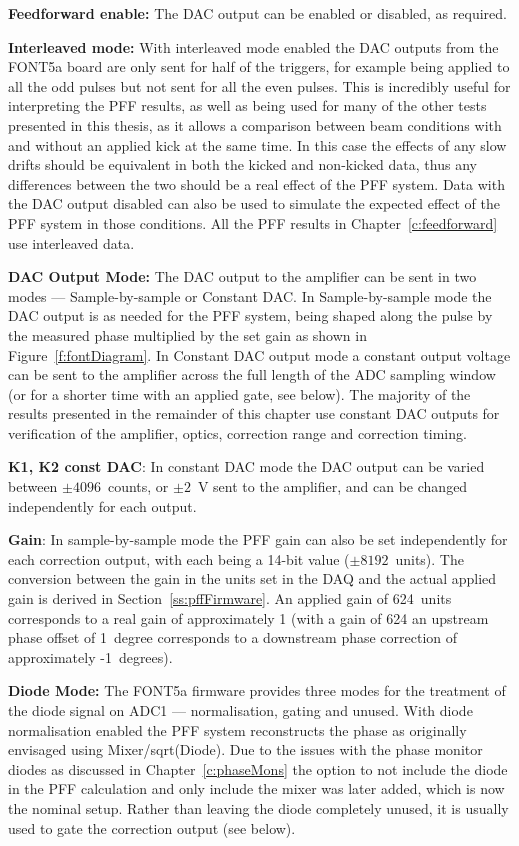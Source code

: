 \textbf{Feedforward enable:} The DAC output can be enabled or disabled, as required.

\textbf{Interleaved mode:} With interleaved mode enabled the DAC outputs from the FONT5a board are only sent for half of the triggers, for example being applied to all the odd pulses but not sent for all the even pulses. This is incredibly useful for interpreting the PFF results, as well as being used for many of the other tests presented in this thesis, as it allows a comparison between beam conditions with and without an applied kick at the same time. In this case the effects of any slow drifts should be equivalent in both the kicked and non-kicked data, thus any differences between the two should be a real effect of the PFF system. Data with the DAC output disabled can also be used to simulate the expected effect of the PFF system in those conditions. All the PFF results in Chapter~\ref{c:feedforward} use interleaved data.

\textbf{DAC Output Mode:} The DAC output to the amplifier can be sent in two modes --- Sample-by-sample or Constant DAC. In Sample-by-sample mode the DAC output is as needed for the PFF system, being shaped along the pulse by the measured phase multiplied by the set gain as shown in Figure~\ref{f:fontDiagram}. In Constant DAC output mode a constant output voltage can be sent to the amplifier across the full length of the ADC sampling window (or for a shorter time with an applied gate, see below). The majority of the results presented in the remainder of this chapter use constant DAC outputs for verification of the amplifier, optics, correction range and correction timing.

\textbf{K1, K2 const DAC}: In constant DAC mode the DAC output can be varied between \(\pm4096\)~counts, or \(\pm2\)~V sent to the amplifier, and can be changed independently for each output.

\textbf{Gain}: In sample-by-sample mode the PFF gain can also be set independently for each correction output, with each being a 14-bit value (\(\pm8192\)~units). The conversion between the gain in the units set in the DAQ and the actual applied gain is derived in Section~\ref{ss:pffFirmware}. An applied gain of 624~units corresponds to a real gain of approximately 1 (with a gain of 624 an upstream phase offset of 1~degree corresponds to a downstream phase correction of approximately -1~degrees).

\textbf{Diode Mode:} The FONT5a firmware provides three modes for the treatment of the diode signal on ADC1 --- normalisation, gating and unused. With diode normalisation enabled the PFF system reconstructs the phase as originally envisaged using Mixer/sqrt(Diode). Due to the issues with the phase monitor diodes as discussed in Chapter~\ref{c:phaseMons} the option to not include the diode in the PFF calculation and only include the mixer was later added, which is now the nominal setup. Rather than leaving the diode completely unused, it is usually used to gate the correction output (see below).

